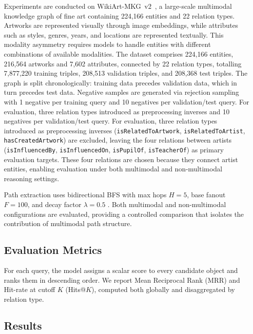 \documentclass[runningheads]{llncs}
\begin{document}
Experiments are conducted on WikiArt-MKG~v2~\cite{efthymiou2026vlkge},
a large-scale multimodal knowledge graph of fine art containing
224,166 entities and 22 relation types. Artworks are represented
visually through image embeddings, while attributes such as styles,
genres, years, and locations are represented textually. This modality
asymmetry requires models to handle entities with different
combinations of available modalities. The dataset comprises 224,166
entities, 216,564 artworks and 7,602 attributes, connected by 22
relation types, totalling 7,877,220 training triples, 208,513
validation triples, and 208,368 test triples. The graph is split
chronologically: training data precedes validation data, which in
turn precedes test data. Negative samples are generated via rejection
sampling with 1 negative per training query and 10 negatives per
validation/test query. For evaluation, three relation types
introduced as preprocessing inverses
and 10 negatives per validation/test query. For evaluation, three
relation types introduced as preprocessing inverses
(\texttt{isRelatedToArtwork}, \texttt{isRelatedToArtist},
\texttt{hasCreatedArtwork}) are excluded, leaving the four
relations between artists (\texttt{isInfluencedBy},
\texttt{isInfluencedOn}, \texttt{isPupilOf}, \texttt{isTeacherOf})
as primary evaluation targets. These four relations are chosen
because they connect artist entities, enabling evaluation under both
multimodal and non-multimodal reasoning settings.

Path extraction uses bidirectional BFS with max hops $H = 5$, base
fanout $F = 100$, and decay factor $\lambda = 0.5$
\cite{icaart26}. Both multimodal and non-multimodal configurations are evaluated, providing a controlled comparison that isolates the contribution of multimodal path structure.

\subsection{Evaluation Metrics}
\label{sec:evaluation-metrics}

For each query, the model assigns a scalar score to every candidate
object and ranks them in descending order. We report Mean Reciprocal
Rank (MRR) and Hit-rate at cutoff $K$ (Hits@$K$), computed both
globally and disaggregated by relation type.

\subsection{Results}
\label{sec:results}
\end{document}
